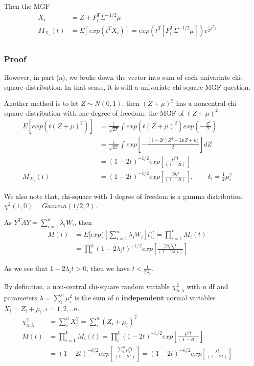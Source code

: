 \documentclass[11pt]{article} %
\begin{document}
Then the MGF
 \begin{align*}
 	X_i &= Z + P_i^T \Sigma^{-1/2} \mu \\
	M_{X_i}(t)	&= E[ exp(t^T X_i) ]= exp(t^T [P_i^T \Sigma^{-1/2} \mu]) e^{\frac{1}{2} t^T t} \\
\end{align*}  



\subsubsection{Proof}	

	However, in part (a), we broke down the vector into sum of each univariate chi-square distribution. In that sense, it is still a univariate chi-square MGF question.
	
	Another method is to let $Z \sim N(0,1)$, then $(Z+\mu)^2$ has a noncentral chi-square distribution with one degree of freedom, the MGF of $(Z+\mu)^2$
	\begin{align*}
		E[exp(t (Z+\mu)^2)] &=\frac{1}{\sqrt{2\pi}} \int exp(t (Z+\mu)^2)  exp(-\frac{Z^2}{2})\\
		&= \frac{1}{\sqrt{2\pi}} \int exp[- \frac{(1-2t)Z^2 - 2\mu Z + \mu_i^2}{2}] dZ\\
		&= (1-2t)^{-1/2} exp[\frac{\mu^2 t}{(1-2t)}] \\
		M_{W_i}(t) &= (1-2t)^{-1/2} exp[\frac{2 \delta_i t}{(1-2t)}], \qquad \delta_i = \frac{1}{2} \mu_i^2
	\end{align*} 

	We also note that, chi-square with 1 degree of freedom is a gamma distribution $\chi^2(1,0) = Gamma(1/2, 2)$.
	
	As $Y^TAY = \sum_{i=1}^n \lambda_i W_i$, then 
\begin{align*}
	M(t) &= E\Big[exp \Big( [\sum_{i=1}^n \lambda_i W_i ] t\Big) \Big] = \prod_{i=1}^k M_i(t) \\
	&= \prod_i^k (1-2 \lambda_i t)^{-1/2} exp[\frac{2 \delta_i \lambda_i t}{(1-2 \lambda_i t)}] 
\end{align*}  	
	
	As we see that $1-2 \lambda_i t > 0$, then we have $t < \frac{1}{2 \lambda_i}$.
	
	
	By definition, a non-central chi-square random variable $\chi^2_{n,\lambda}$ with $n$ df and parameters $\lambda = \sum_i^n \mu_i^2$ is the sum of n $\textbf{independent} $ normal variables $X_i = Z_i + \mu_i, i=1,2,..n$. 
	\begin{align*}
		\chi^2_{n,\lambda} &= \sum_i^n X_i^2 = \sum_i^n (Z_i + \mu_i)^2 \\
		M(t) &= \prod_{i=1}^k M_i(t) =\prod_i^k (1-2t)^{-1/2} exp[\frac{\mu^2 t}{(1-2t)}] \\
		&= (1-2t)^{-k/2} exp[\frac{\sum_i^n \mu_i^2 t}{(1-2t)}] =(1-2t)^{-n/2} exp[\frac{\lambda t}{(1-2t)}]
	\end{align*}  
	
\end{document}
